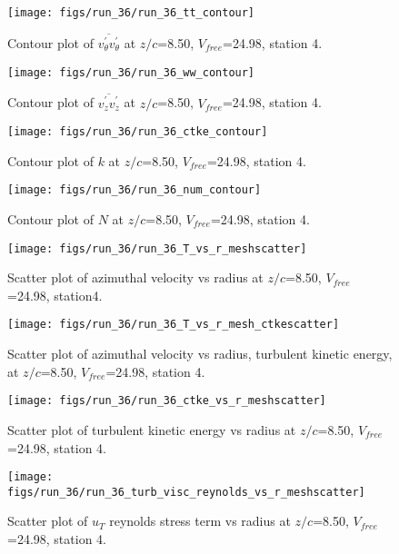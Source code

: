 \begin{figure}[H]
\centering
\texttt{[image: figs/run\_36/run\_36\_tt\_contour]}
\caption{Contour plot of $\overline{v_{\theta}^{\prime} v_{\theta}^{\prime}}$ at $z/c$=8.50, $V_{free}$=24.98, station 4.}
\end{figure}


\begin{figure}[H]
\centering
\texttt{[image: figs/run\_36/run\_36\_ww\_contour]}
\caption{Contour plot of $\overline{v_{z}^{\prime} v_{z}^{\prime}}$ at $z/c$=8.50, $V_{free}$=24.98, station 4.}
\end{figure}


\begin{figure}[H]
\centering
\texttt{[image: figs/run\_36/run\_36\_ctke\_contour]}
\caption{Contour plot of $k$ at $z/c$=8.50, $V_{free}$=24.98, station 4.}
\end{figure}


\begin{figure}[H]
\centering
\texttt{[image: figs/run\_36/run\_36\_num\_contour]}
\caption{Contour plot of $N$ at $z/c$=8.50, $V_{free}$=24.98, station 4.}
\end{figure}


\begin{figure}[H]
\centering
\texttt{[image: figs/run\_36/run\_36\_T\_vs\_r\_meshscatter]}
\caption{Scatter plot of azimuthal velocity vs radius at $z/c$=8.50, $V_{free}$=24.98, station4.}
\end{figure}


\begin{figure}[H]
\centering
\texttt{[image: figs/run\_36/run\_36\_T\_vs\_r\_mesh\_ctkescatter]}
\caption{Scatter plot of azimuthal velocity vs radius, turbulent kinetic energy, at $z/c$=8.50, $V_{free}$=24.98, station 4.}
\end{figure}


\begin{figure}[H]
\centering
\texttt{[image: figs/run\_36/run\_36\_ctke\_vs\_r\_meshscatter]}
\caption{Scatter plot of turbulent kinetic energy vs radius at $z/c$=8.50, $V_{free}$=24.98, station 4.}
\end{figure}


\begin{figure}[H]
\centering
\texttt{[image: figs/run\_36/run\_36\_turb\_visc\_reynolds\_vs\_r\_meshscatter]}
\caption{Scatter plot of $
u_T$ reynolds stress term vs radius at $z/c$=8.50, $V_{free}$=24.98, station 4.}
\end{figure}


